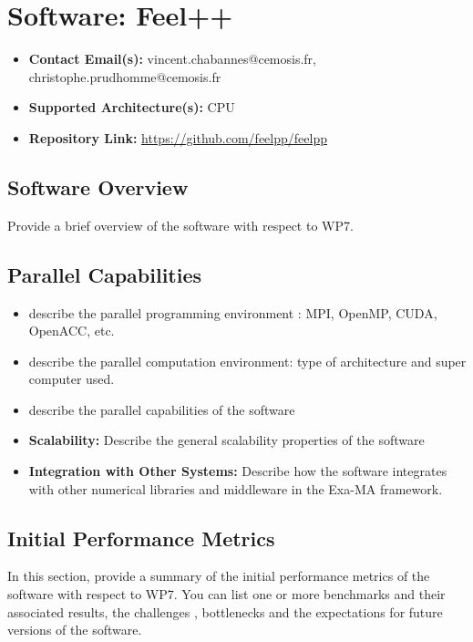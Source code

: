 \section{Software: Feel++}
\label{sec:WP7:Feel++:software}

\begin{itemize}
    \item \textbf{Contact Email(s):} vincent.chabannes@cemosis.fr, christophe.prudhomme@cemosis.fr
    \item \textbf{Supported Architecture(s):} CPU
    \item \textbf{Repository Link:} \href{https://github.com/feelpp/feelpp}{https://github.com/feelpp/feelpp}
\end{itemize}

\subsection{Software Overview}
\label{sec:WP7:Feel++:summary}

Provide a brief overview of the software with respect to WP7.

\subsection{Parallel Capabilities}
\label{sec:WP7:Feel++:performances}


\begin{itemize}
    \item describe the parallel programming  environment : MPI, OpenMP, CUDA, OpenACC, etc.
    \item describe the parallel computation environment: type of architecture and super computer used.
    \item describe the parallel capabilities of the software
    \item \textbf{Scalability:} Describe the general scalability properties of the software
    \item \textbf{Integration with Other Systems:} Describe how the software integrates with other numerical libraries and middleware in the Exa-MA framework.
\end{itemize}

\subsection{Initial Performance Metrics}
\label{sec:WP7:Feel++:metrics}

In this section, provide a summary of the initial performance metrics of the software with respect to WP7.
You can list one or more benchmarks and their associated results, the challenges , bottlenecks and the expectations for future versions of the software.



